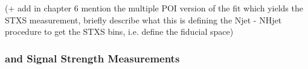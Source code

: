 (+ add in chapter 6 mention the multiple POI version of the fit which yields the
STXS measurement, briefly describe what this is defining the Njet - NHjet
procedure to get the STXS bins, i.e. define the fiducial space)







\subsubsection{\WH and \ZH Signal Strength Measurements}

